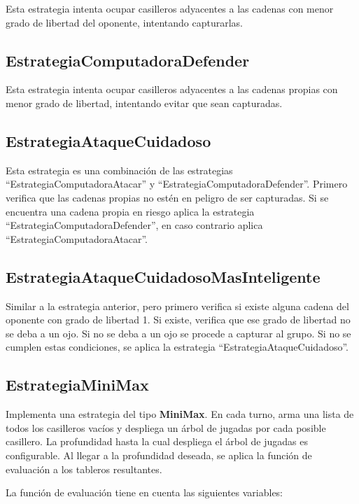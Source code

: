 \documentclass[11pt]{article}
\begin{document}
    Esta estrategia intenta ocupar casilleros adyacentes a las cadenas
    con menor grado de libertad del oponente, intentando capturarlas.
\subsection{EstrategiaComputadoraDefender}
\label{sec-4.3.2}

    Esta estrategia intenta ocupar casilleros adyacentes a las cadenas
    propias con menor grado de libertad, intentando evitar que sean
    capturadas.
\subsection{EstrategiaAtaqueCuidadoso}
\label{sec-4.3.3}

    Esta estrategia es una combinación de las estrategias
    ``EstrategiaComputadoraAtacar'' y
    ``EstrategiaComputadoraDefender''. Primero verifica que las
    cadenas propias no estén en peligro de ser capturadas. Si se
    encuentra una cadena propia en riesgo aplica la estrategia
    ``EstrategiaComputadoraDefender'', en caso contrario aplica
    ``EstrategiaComputadoraAtacar''.
\subsection{EstrategiaAtaqueCuidadosoMasInteligente}
\label{sec-4.3.4}

    Similar a la estrategia anterior, pero primero verifica si existe
    alguna cadena del oponente con grado de libertad 1. Si existe,
    verifica que ese grado de libertad no se deba a un ojo. Si no se
    deba a un ojo se procede a capturar al grupo. Si no se cumplen
    estas condiciones, se aplica la estrategia
    ``EstrategiaAtaqueCuidadoso''.

\subsection{EstrategiaMiniMax}

   Implementa una estrategia del tipo {\bf MiniMax}. En cada turno,
   arma una lista de todos los casilleros vac\'ios y despliega un
   \'arbol de jugadas por cada posible casillero. La profundidad hasta
   la cual despliega el \'arbol de jugadas es configurable. Al llegar a
   la profundidad deseada, se aplica la funci\'on de evaluaci\'on a
   los tableros resultantes.
   
   La funci\'on de evaluaci\'on tiene en cuenta las siguientes
   variables:
   
\end{document}
